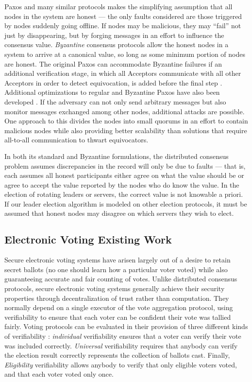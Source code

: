     Paxos and many similar protocols makes the simplifying assumption that all
    nodes in the system are honest --- the only faults considered are those
    triggered by nodes suddenly going offline. If nodes may be malicious, they
    may ``fail'' not just by disappearing, but by forging messages in an effort
    to influence the consensus value. \emph{Byzantine} consensus protocols allow
    the honest nodes in a system to arrive at a canonical value, so long as some
    minimum portion of nodes are honest. The original Paxos can
    accommodate Byzantine failures if an additional verification stage, in which
    all Acceptors communicate with all other Acceptors in order to detect
    equivocation, is added before the final step \cite{castro_practical_1999}.
    Additional optimizations to regular and Byzantine Paxos have also been
    developed \cite{lamport_fast_2006}. If the adversary can not only send
    arbitrary messages but also monitor messages exchanged among other nodes,
    additional attacks are possible. One approach to this divides the nodes into
    small quorums in an effort to contain malicious nodes \cite{king_load_2011}
    while also providing better scalability than solutions that require
    all-to-all communication to thwart equivocators.

    In both its standard and Byzantine formulations, the distributed consensus
    problem assumes discrepancies in the record will only be due to faults ---
    that is, each assumes all honest participants either agree on what the value
    should be or agree to accept the value reported by the nodes who do know the
    value.  In the election of rotating leaders or servers, the correct value is
    not knowable a priori. If our leader election algorithm is modeled on other
    election protocols, it must be assumed that honest nodes may disagree on
    which servers they wish to elect.

  \subsection{Electronic Voting Existing Work} \label{Subsection:evoting}
    Secure electronic voting systems have arisen largely out of a desire to
    retain secret ballots (no one should learn how a particular voter voted)
    while also guaranteeing accurate and fair counting of votes. Unlike
    distributed consensus protocols, secure electronic voting systems generally
    achieve their security properties through decentralization of trust rather
    than computation. They normally depend on a single executor of the vote
    aggregation protocol, using verifiability to ensure that each voter can be
    confident their vote was tallied fairly. Voting protocols can be evaluated
    in their provision of three different kinds of verifiability
    \cite{kremer_election_2010}: \emph{individual} verifiability ensures that a
    voter can verify their vote was included correctly. \emph{Universal}
    verifiability requires that anybody can verify the election result correctly
    represents the collection of ballots cast. Finally, \emph{Eligibility}
    verifiability allows anybody to verify that only eligible voters voted, and
    that each voter voted only once.

